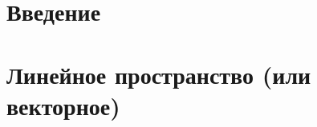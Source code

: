 \documentclass[a4paper]{article}
\begin{document}
  

  \section{Введение}
  
  \newpage
  
  \newpage
  

  
  \newpage
  \section{Линейное пространство (или векторное)}
  
\end{document}
